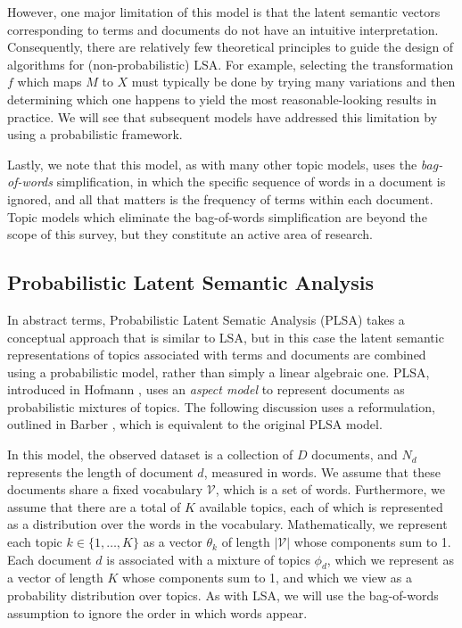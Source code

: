 \documentclass{article}
\begin{document}
However, one major limitation of this model is that the latent semantic vectors corresponding to terms and documents do not have an intuitive interpretation.
Consequently, there are relatively few theoretical principles to guide the design of algorithms for (non-probabilistic) LSA.
For example, selecting the transformation $f$ which maps $M$ to $X$ must typically be done by trying many variations and then determining which one happens to yield the most reasonable-looking results in practice.
We will see that subsequent models have addressed this limitation by using a probabilistic framework.

Lastly, we note that this model, as with many other topic models, uses the \emph{bag-of-words} simplification, in which the specific sequence of words in a document is ignored, and all that matters is the frequency of terms within each document.
Topic models which eliminate the bag-of-words simplification are beyond the scope of this survey, but they constitute an active area of research.

\subsection{Probabilistic Latent Semantic Analysis}

In abstract terms, Probabilistic Latent Sematic Analysis (PLSA) takes a conceptual approach that is similar to LSA, but in this case the latent semantic representations of topics associated with terms and documents are combined using a probabilistic model, rather than simply a linear algebraic one.
PLSA, introduced in Hofmann \cite{hofmann1999plsa}, uses an \emph{aspect model} to represent documents as probabilistic mixtures of topics.
The following discussion uses a reformulation, outlined in Barber \cite{barber2012bayesian}, which is equivalent to the original PLSA model.

In this model, the observed dataset is a collection of $D$ documents, and $N_d$ represents the length of document $d$, measured in words.
We assume that these documents share a fixed vocabulary $\mathcal V$, which is a set of words.
Furthermore, we assume that there are a total of $K$ available topics, each of which is represented as a distribution over the words in the vocabulary.
Mathematically, we represent each topic $k \in \{1, \ldots, K\}$ as a vector $\theta_k$ of length $|\mathcal V|$ whose components sum to 1.
Each document $d$ is associated with a mixture of topics $\phi_d$, which we represent as a vector of length $K$ whose components sum to 1, and which we view as a probability distribution over topics.
As with LSA, we will use the bag-of-words assumption to ignore the order in which words appear.
\end{document}
